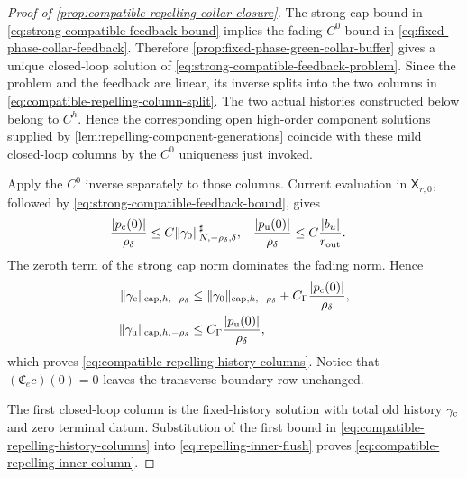 \begin{proof}[Proof of
\cref{prop:compatible-repelling-collar-closure}]
The strong cap bound in
\cref{eq:strong-compatible-feedback-bound} implies the fading \(C^0\)
bound in \cref{eq:fixed-phase-collar-feedback}.  Therefore
\cref{prop:fixed-phase-green-collar-buffer} gives a unique closed-loop
solution of \cref{eq:strong-compatible-feedback-problem}.  Since the
problem and the feedback are linear, its inverse splits into the two
columns in \cref{eq:compatible-repelling-column-split}.  The two actual
histories constructed below belong to \(C^h\).  Hence the corresponding
open high-order component solutions supplied by
\cref{lem:repelling-component-generations} coincide with these mild
closed-loop columns by the \(C^0\) uniqueness just invoked.

Apply the \(C^0\) inverse separately to those columns.  Current evaluation
in \(\mathsf X_{r,0}\), followed by
\cref{eq:strong-compatible-feedback-bound}, gives
\begin{align*}
 \frac{|p_{\rm c}(0)|}{\rho_\delta}
 &\le C\|\gamma_0\|_{N,-\rho_\delta,\delta}^{\sharp},&
 \frac{|p_{\rm u}(0)|}{\rho_\delta}
 &\le C\frac{|b_u|}{r_{\rm out}}.
\end{align*}
The zeroth term of the strong cap norm dominates the fading norm.  Hence
\begin{align*}
 \|\gamma_{\rm c}\|_{\mathrm{cap},h,-\rho_\delta}
 &\le\|\gamma_0\|_{\mathrm{cap},h,-\rho_\delta}
       +C_\Gamma\frac{|p_{\rm c}(0)|}{\rho_\delta},\\
 \|\gamma_{\rm u}\|_{\mathrm{cap},h,-\rho_\delta}
 &\le C_\Gamma\frac{|p_{\rm u}(0)|}{\rho_\delta},
\end{align*}
which proves \cref{eq:compatible-repelling-history-columns}.  Notice that
\((\mathfrak C_ec)(0)=0\) leaves the transverse boundary row unchanged.

The first closed-loop column is the fixed-history solution with total old
history \(\gamma_{\rm c}\) and zero terminal datum.  Substitution of the
first bound in \cref{eq:compatible-repelling-history-columns} into
\cref{eq:repelling-inner-flush} proves
\cref{eq:compatible-repelling-inner-column}.


\end{proof}
